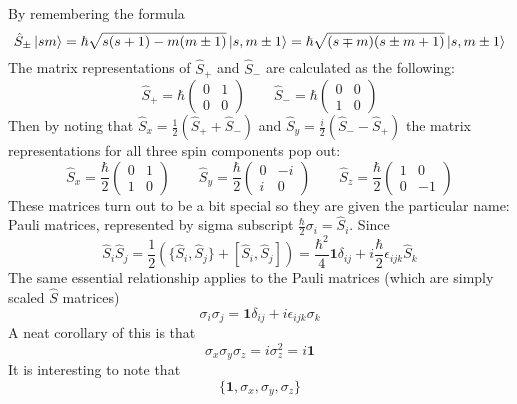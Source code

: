 \documentclass{article}
\begin{document}
By remembering the formula 
\begin{equation*}
\hat{S}_\pm \ket{sm} = \hbar\sqrt{s(s+1) - m(m\pm 1)} \ket{s,m\pm 1} = \hbar \sqrt{(s\mp m)(s \pm m + 1)}\ket{s,m\pm 1}
\end{equation*}
The matrix representations of $\hat{S}_+$ and $\hat{S}_-$ are calculated as the following:
\[\hat{S}_+ = \hbar\begin{pmatrix} 0 & 1 \\ 0 & 0 \end{pmatrix} \qquad \hat{S}_- = \hbar\begin{pmatrix} 0 & 0 \\ 1 & 0\end{pmatrix}
\]
Then by noting that $\hat{S}_x = \frac{1}{2}(\hat{S}_+ + \hat{S}_-)$ and $\hat{S}_y = \frac{i}{2}(\hat{S}_- - \hat{S}_+)$ the matrix representations for all three spin components pop out:
\begin{equation*}
\hat{S}_x = \frac{\hbar}{2}\begin{pmatrix} 0 & 1 \\ 1 & 0 \end{pmatrix} \qquad \hat{S}_y = \frac{\hbar}{2}\begin{pmatrix} 0 & -i \\ i & 0\end{pmatrix} \qquad \hat{S}_z = \frac{\hbar}{2}\begin{pmatrix} 1 & 0 \\ 0 & -1\end{pmatrix}
\end{equation*}
These matrices turn out to be a bit special so they are given the particular name: Pauli matrices, represented by sigma subscript $\frac{\hbar}{2}\sigma_i = \hat{S}_i$. Since
\begin{equation*} \hat{S}_i\hat{S}_j = \frac{1}{2}(\{\hat{S}_i, \hat{S}_j\} + [\hat{S}_i, \hat{S}_j]) = \frac{\hbar^2}{4}\mathbf{1}\delta_{ij} + i\frac{\hbar}{2}\epsilon_{ijk} \hat{S}_k \end{equation*}
The same essential relationship applies to the Pauli matrices (which are simply scaled $\hat{S}$ matrices)
\begin{equation*} \sigma_i\sigma_j = \mathbf{1}\delta_{ij} + i\epsilon_{ijk}\sigma_k \end{equation*}
A neat corollary of this is that 
\begin{equation*} \sigma_x\sigma_y\sigma_z = i\sigma_z^2 = i\mathbf{1} \end{equation*}
It is interesting to note that 
\begin{equation*} \{\mathbf{1},\sigma_x, \sigma_y, \sigma_z\} \end{equation*}
\end{document}
